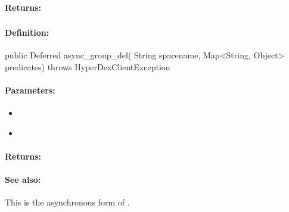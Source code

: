 \paragraph{Returns:}


\pagebreak
\subsubsection{}
\label{api:java:async_group_del}


\paragraph{Definition:}
\begin{javacode}
public Deferred async_group_del(
        String spacename,
        Map<String, Object> predicates) throws HyperDexClientException
\end{javacode}

\paragraph{Parameters:}
\begin{itemize}[noitemsep]
\item {}\\

\item {}\\

\end{itemize}

\paragraph{Returns:}


\paragraph{See also:}  This is the asynchronous form of .

\pagebreak
\subsubsection{}
\label{api:java:count}


